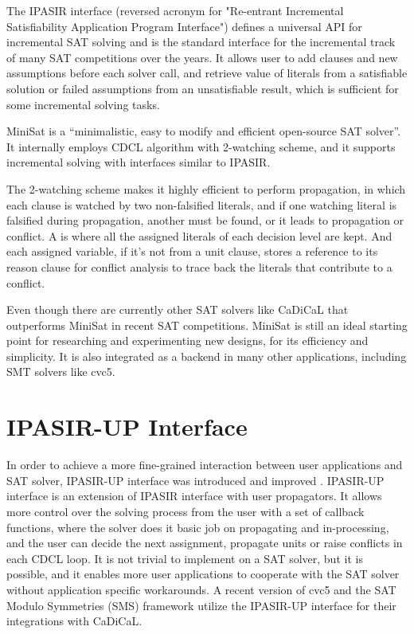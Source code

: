 The IPASIR interface (reversed acronym for "Re-entrant Incremental Satisfiability Application Program Interface") defines a universal API for incremental SAT solving and is the standard interface for the incremental track of many SAT competitions over the years. \cite{BALYO201645} It allows user to add clauses and new assumptions before each solver call, and retrieve value of literals from a satisfiable solution or failed assumptions from an unsatisfiable result, which is sufficient for some incremental solving tasks.

MiniSat is a ``minimalistic, easy to modify and efficient open-source SAT solver''. It internally employs CDCL algorithm with 2-watching scheme, and it supports incremental solving with interfaces similar to IPASIR.

The 2-watching scheme makes it highly efficient to perform propagation, in which each clause is watched by two non-falsified literals, and if one watching literal is falsified during propagation, another must be found, or it leads to propagation or conflict. A  is where all the assigned literals of each decision level are kept. And each assigned variable, if it's not from a unit clause, stores a reference to its reason clause for conflict analysis to trace back the literals that contribute to a conflict.

Even though there are currently other SAT solvers like CaDiCaL that outperforms MiniSat in recent SAT competitions. MiniSat is still an ideal starting point for researching and experimenting new designs, for its efficiency and simplicity. It is also integrated as a backend in many other applications, including SMT solvers like cvc5.

\section{IPASIR-UP Interface}

In order to achieve a more fine-grained interaction between user applications and SAT solver, IPASIR-UP interface was introduced and improved \cite{fazekas_et_al:LIPIcs.SAT.2023.8}\cite{FazekasNiemetzPreinerKirchwegerSzeiderBiere-JAIR24}. IPASIR-UP interface is an extension of IPASIR interface with user propagators. It allows more control over the solving process from the user with a set of callback functions, where the solver does it basic job on propagating and in-processing, and the user can decide the next assignment, propagate units or raise conflicts in each CDCL loop. It is not trivial to implement on a SAT solver, but it is possible, and it enables more user applications to cooperate with the SAT solver without application specific workarounds. A recent version of cvc5 and the SAT Modulo Symmetries (SMS) framework utilize the IPASIR-UP interface for their integrations with CaDiCaL.

